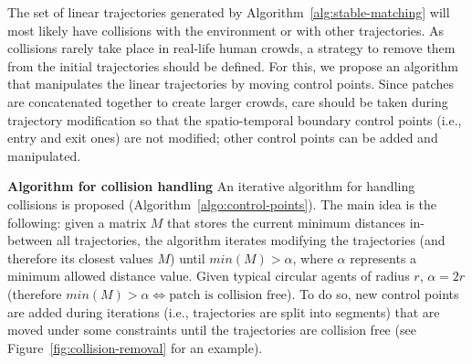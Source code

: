 The set of linear trajectories generated by Algorithm~\ref{alg:stable-matching} will most likely have collisions with the environment or with other trajectories. As collisions rarely take place in real-life human crowds, a strategy to remove them from the initial trajectories should be defined. For this, we propose an algorithm that manipulates the linear trajectories by moving control points.
Since patches are concatenated together to create larger crowds, care should be taken during trajectory modification so that the spatio-temporal boundary control points (i.e., entry and exit ones) are not modified; other control points can be added and manipulated.


\textbf{Algorithm for collision handling} An iterative algorithm for handling collisions is proposed (Algorithm~\ref{algo:control-points}).
The main idea is the following: given a matrix $M$ that stores the current minimum distances in-between all trajectories, the algorithm iterates modifying the trajectories (and therefore its closest values $M$) until $min(M) > \alpha$, where $\alpha$ represents a minimum allowed distance value.
Given typical circular agents of radius $r$, $\alpha = 2r$ (therefore $min(M) > \alpha \Leftrightarrow \text{patch is collision free}$).
To do so, new control points are added during iterations (i.e., trajectories are split into segments) that are moved under some constraints until the trajectories are collision free (see Figure~\ref{fig:collision-removal} for an example).



